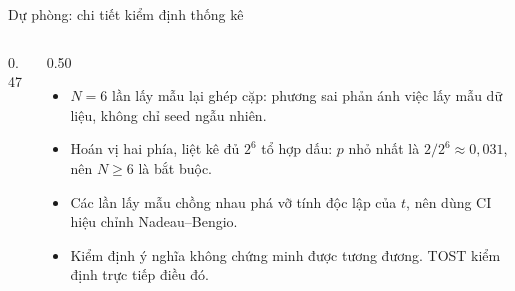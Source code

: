 \documentclass[aspectratio=169, 11pt]{beamer}
\begin{document}
\begin{frame}{Dự phòng: chi tiết kiểm định thống kê}
\begin{columns}[T]
\begin{column}{0.47\textwidth}
    \end{column}
    \begin{column}{0.50\textwidth}
      \begin{itemize}\footnotesize
        \item $N{=}6$ lần lấy mẫu lại ghép cặp: phương sai phản ánh việc lấy
              mẫu dữ liệu, không chỉ seed ngẫu nhiên.
        \item Hoán vị hai phía, liệt kê đủ $2^6$ tổ hợp dấu: $p$ nhỏ nhất là
              $2/2^6 \approx 0{,}031$, nên $N \geq 6$ là bắt buộc.
        \item Các lần lấy mẫu chồng nhau phá vỡ tính độc lập của $t$, nên dùng
              CI hiệu chỉnh Nadeau--Bengio.
        \item Kiểm định ý nghĩa không chứng minh được tương đương. TOST kiểm
              định trực tiếp điều đó.
      \end{itemize}
    \end{column}
  \end{columns}
\end{frame}
\end{document}
